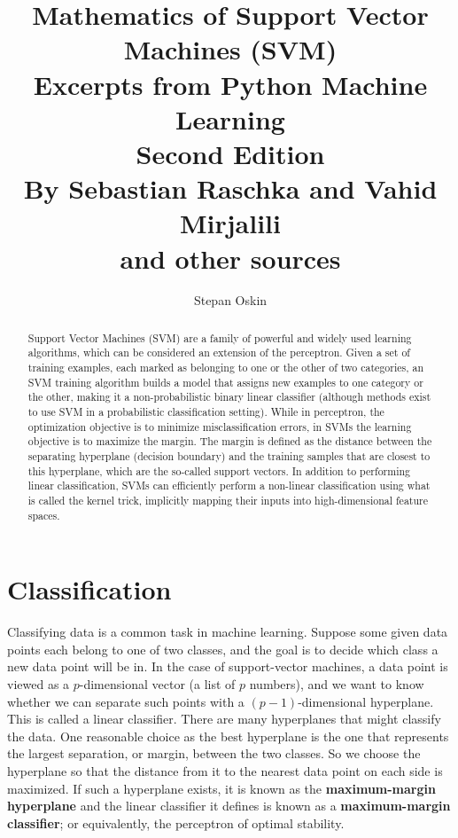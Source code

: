 \documentclass[11pt]{article}
\begin{document}
    \title{Mathematics of Support Vector Machines (SVM) \\
    Excerpts from Python Machine Learning \\
    Second Edition \\
    By Sebastian Raschka and Vahid Mirjalili \\
    and other sources}

    \author{Stepan Oskin}

    \maketitle

    \begin{abstract}

        Support Vector Machines (SVM) are a family of powerful and widely used learning algorithms,
        which can be considered an extension of the perceptron.
        Given a set of training examples, each marked as belonging to one or the other of two categories,
        an SVM training algorithm builds a model that assigns new examples to one category or the other,
        making it a non-probabilistic binary linear classifier (although methods exist to use SVM in
        a probabilistic classification setting).
        While in perceptron, the optimization objective is to minimize misclassification errors,
        in SVMs the learning objective is to maximize the margin.
        The margin is defined as the distance between the separating hyperplane (decision boundary)
        and the training samples that are closest to this hyperplane, which are the so-called support vectors.
        In addition to performing linear classification, SVMs can efficiently perform a non-linear classification
        using what is called the kernel trick, implicitly mapping their inputs into high-dimensional feature spaces.

    \end{abstract}

    \section{Classification} \label{sec:classification}

    Classifying data is a common task in machine learning.
    Suppose some given data points each belong to one of two classes, and the goal is to decide which class a
    new data point will be in.
    In the case of support-vector machines, a data point is viewed as a $p$-dimensional vector
    (a list of $p$ numbers), and we want to know whether we can separate such points with
    a $(p-1)$-dimensional hyperplane.
    This is called a linear classifier.
    There are many hyperplanes that might classify the data.
    One reasonable choice as the best hyperplane is the one that represents the largest separation, or margin,
    between the two classes.
    So we choose the hyperplane so that the distance from it to the nearest data point on each side is maximized.
    If such a hyperplane exists, it is known as the \textbf{maximum-margin hyperplane} and the linear classifier it defines
    is known as a \textbf{maximum-margin classifier};
    or equivalently, the perceptron of optimal stability.
\end{document}
